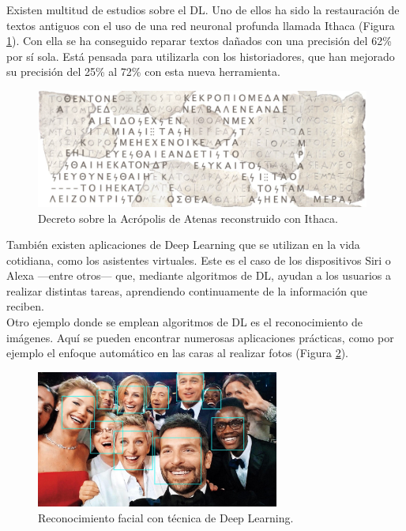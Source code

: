 Existen multitud de estudios sobre el DL. Uno de ellos ha sido la restauración de textos antiguos con el uso de una red neuronal profunda llamada Ithaca \cite{assael22} (Figura \ref{fig:textos}). Con ella se ha conseguido reparar textos dañados con una precisión del 62\% por sí sola. Está pensada para utilizarla con los historiadores, que han mejorado su precisión del 25\% al 72\% con esta nueva herramienta.\\
\begin{figure} [h!]
  \begin{center}
    \includegraphics[width=11cm]{figs/textos}
  \end{center}
  \caption{Decreto sobre la Acrópolis de Atenas reconstruido con Ithaca.}
  \label{fig:textos}
\end{figure}

También existen aplicaciones de Deep Learning que se utilizan en la vida cotidiana, como los asistentes virtuales.  Este es el caso de los dispositivos Siri o Alexa ---entre otros--- que, mediante algoritmos de DL, ayudan a los usuarios a realizar distintas tareas, aprendiendo continuamente de la información que reciben.\\

Otro ejemplo donde se emplean algoritmos de DL es el reconocimiento de imágenes. Aquí se pueden encontrar numerosas aplicaciones prácticas, como por ejemplo el enfoque automático en las caras al realizar fotos (Figura \ref{fig:caras}).\\
\begin{figure} [h!]
  \begin{center}
    \includegraphics[width=8cm]{figs/caras}
  \end{center}
  \caption{Reconocimiento facial con técnica de Deep Learning.}
  \label{fig:caras}
\end{figure}

